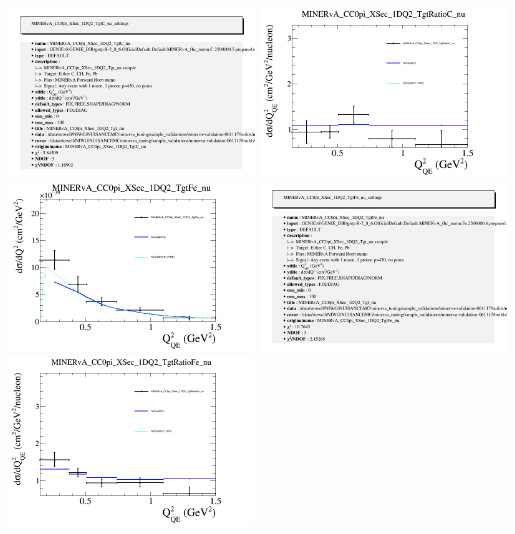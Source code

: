 \documentclass{article}
\begin{document}
\includegraphics[width=0.49\textwidth]{figures/nuisance_MINERvA_CC0pi_XSec_1DQ2_TgtC_nu_info.png}
\centering
\includegraphics[width=0.49\textwidth]{figures/nuisance_MINERvA_CC0pi_XSec_1DQ2_TgtRatioC_nu_comp.png}
\\\centering
\includegraphics[width=0.49\textwidth]{figures/nuisance_MINERvA_CC0pi_XSec_1DQ2_TgtFe_nu_comp.png}
\includegraphics[width=0.49\textwidth]{figures/nuisance_MINERvA_CC0pi_XSec_1DQ2_TgtFe_nu_info.png}
\centering
\includegraphics[width=0.49\textwidth]{figures/nuisance_MINERvA_CC0pi_XSec_1DQ2_TgtRatioFe_nu_comp.png}
\end{document}
